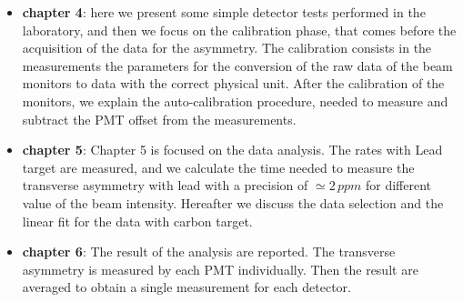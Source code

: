 \begin{itemize}
\item \textbf{chapter 4}: here we present some simple detector tests performed in the laboratory, and then we focus on the calibration phase, that comes before the acquisition of the data for the asymmetry. The calibration consists in the measurements the parameters for the conversion of the raw data of the beam monitors to data with the correct physical unit. After the calibration of the monitors, we explain the auto-calibration procedure, needed to measure and subtract the PMT offset from the measurements.
\item \textbf{chapter 5}: Chapter 5 is focused on the data analysis. The rates with Lead target are measured, and we calculate the time needed to measure the transverse asymmetry with lead with a precision of $\simeq 2 \, ppm$ for different value of the beam intensity. Hereafter we discuss the data selection and the linear fit for the data with carbon target.
\item \textbf{chapter 6}: The result of the analysis are reported. The transverse asymmetry is measured by each PMT individually. Then the result are averaged  to obtain a single measurement for each detector.  
\end{itemize}